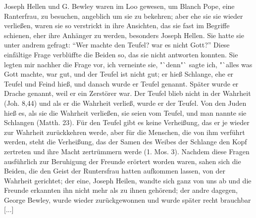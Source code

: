 Joseph Hellen und G. 
Bewley waren im Loo gewesen, um
Blanch Pope, eine Ranterfrau, 
zu besuchen, angeblich um sie zu
bekehren; aber ehe sie sie wieder verließen, waren sie so verstrickt
in ihre Ansichten, das sie fast im Begriffe schienen, eher ihre Anhänger 
zu werden, besonders Joseph Hellen. Sie hatte sie unter
andrem gefragt: "`Wer machte den Teufel? war es nicht Gott?"'
Diese einfältige Frage verblüffte die Beiden so, das sie nicht 
antworten konnten. Sie legten mir nachher die Frage vor, ich 
verneinte sie, "`denn"` sagte ich, "`alles was Gott machte, war gut,
und der Teufel ist nicht gut; er hieß Schlange, ehe er Teufel und
Feind hieß, und danach wurde er Teufel genannt. Später
wurde er Drache genannt, weil er ein Zerstörer war. Der Teufel
blieb nicht in der Wahrheit (Joh. 8,44) und als er die Wahrheit
verließ, wurde er der Teufel. Von den Juden hieß es, als sie
die Wahrheit verließen, sie seien vom Teufel, und man nannte
sie Schlangen (Matth. 23). Für den Teufel 
gibt es keine Verheißung, 
das er je wieder zur Wahrheit zurückkehren werde, aber
für die Menschen, die von ihm verführt werden, steht die Verheißung, 
das der Samen des Weibes der Schlange den Kopf zertreten 
und ihre Macht zertrümmern werde (1. Mos. 3). Nachdem
diese Fragen ausführlich zur Beruhigung der Freunde erörtert
worden waren, sahen sich die Beiden, die den Geist der Runtersfrau 
hatten aufkommen lassen, von der Wahrheit gerichtet; der
eine, Joseph Heilen, 
wandte sich ganz von uns ab und die Freunde
erkannten ihn nicht mehr als zu ihnen gehörend; der andre dagegen, 
George Bewley, wurde wieder zurückgewonnen und wurde
später recht brauchbar [...]

